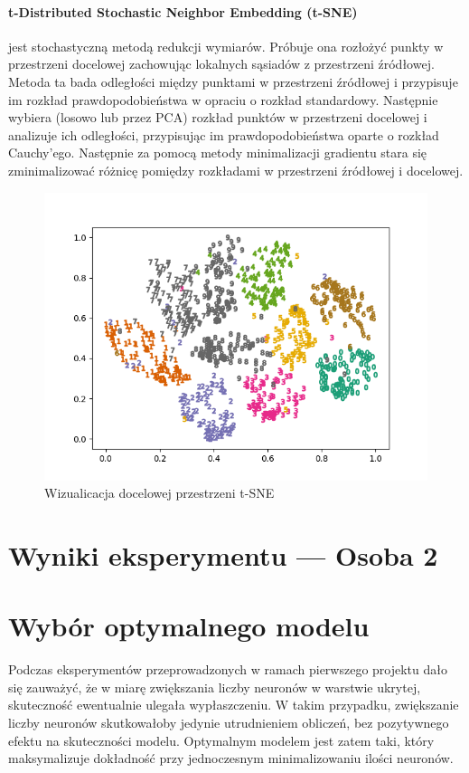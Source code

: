 \documentclass[10pt]{article}
\begin{document}
\paragraph{t-Distributed Stochastic Neighbor Embedding (t-SNE)} jest stochastyczną metodą redukcji wymiarów.
Próbuje ona rozłożyć punkty w przestrzeni docelowej zachowując lokalnych sąsiadów z przestrzeni źródłowej. 
Metoda ta bada odległości między punktami w przestrzeni źródłowej i przypisuje im rozkład prawdopodobieństwa w opraciu o rozkład standardowy.
Następnie wybiera (losowo lub przez PCA) rozkład punktów w przestrzeni docelowej i analizuje ich odległości, przypisując im prawdopodobieństwa oparte o rozkład Cauchy'ego.
Następnie za pomocą metody minimalizacji gradientu stara się zminimalizować różnicę pomiędzy rozkładami w przestrzeni źródłowej i docelowej.

\begin{figure}[H]\centering
    \includegraphics[width=.6\linewidth]{img/tsne_embedding.png}
    \caption{Wizualicacja docelowej przestrzeni t-SNE}
\end{figure}

\pagebreak

\section{Wyniki eksperymentu --- Osoba 2}
\pagebreak

\section{Wybór optymalnego modelu}

Podczas eksperymentów przeprowadzonych w ramach pierwszego projektu dało się zauważyć, że w miarę zwiększania
liczby neuronów w warstwie ukrytej, skuteczność ewentualnie ulegała wypłaszczeniu.
W takim przypadku, zwiększanie liczby neuronów skutkowałoby jedynie utrudnieniem obliczeń, bez pozytywnego efektu na skuteczności modelu.
Optymalnym modelem jest zatem taki, który maksymalizuje dokładność przy jednoczesnym minimalizowaniu ilości neuronów.
\end{document}
